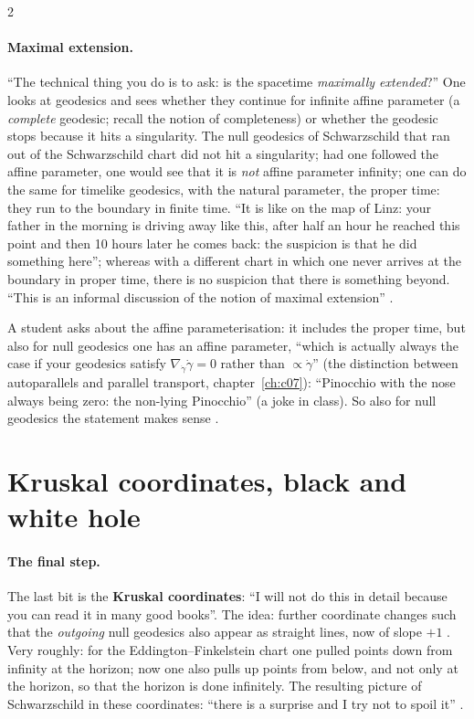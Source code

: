 \begin{paracol}{2}
\paragraph{Maximal extension.} ``The technical thing you do is to ask: is the spacetime \emph{maximally extended}?'' One looks at geodesics and sees whether they continue for infinite affine parameter (a \emph{complete} geodesic; recall the notion of completeness) or whether the geodesic stops because it hits a singularity. The null geodesics of Schwarzschild that ran out of the Schwarzschild chart did not hit a singularity; had one followed the affine parameter, one would see that it is \emph{not} affine parameter infinity; one can do the same for timelike geodesics, with the natural parameter, the proper time: they run to the boundary in finite time. ``It is like on the map of Linz: your father in the morning is driving away like this, after half an hour he reached this point and then 10 hours later he comes back: the suspicion is that he did something here''; whereas with a different chart in which one never arrives at the boundary in proper time, there is no suspicion that there is something beyond. ``This is an informal discussion of the notion of maximal extension'' .
\begin{coursenote}
A student asks about the affine parameterisation: it includes the proper time, but also for null geodesics one has an affine parameter, ``which is actually always the case if your geodesics satisfy $\nabla_{\dot\gamma}\dot\gamma=0$ rather than $\propto\dot\gamma$'' (the distinction between autoparallels and parallel transport, chapter~\ref{ch:c07}): ``Pinocchio with the nose always being zero: the non-lying Pinocchio'' (a joke in class). So also for null geodesics the statement makes sense .
\end{coursenote}

\section{Kruskal coordinates, black and white hole}\label{sec:c22-kruskal}

\paragraph{The final step.} The last bit is the \textbf{Kruskal coordinates}: ``I will not do this in detail because you can read it in many good books''. The idea: further coordinate changes such that the \emph{outgoing} null geodesics also appear as straight lines, now of slope $+1$ . Very roughly: for the Eddington--Finkelstein chart one pulled points down from infinity at the horizon; now one also pulls up points from below, and not only at the horizon, so that the horizon is done infinitely. The resulting picture of Schwarzschild in these coordinates: ``there is a surprise and I try not to spoil it'' .


\end{paracol}
